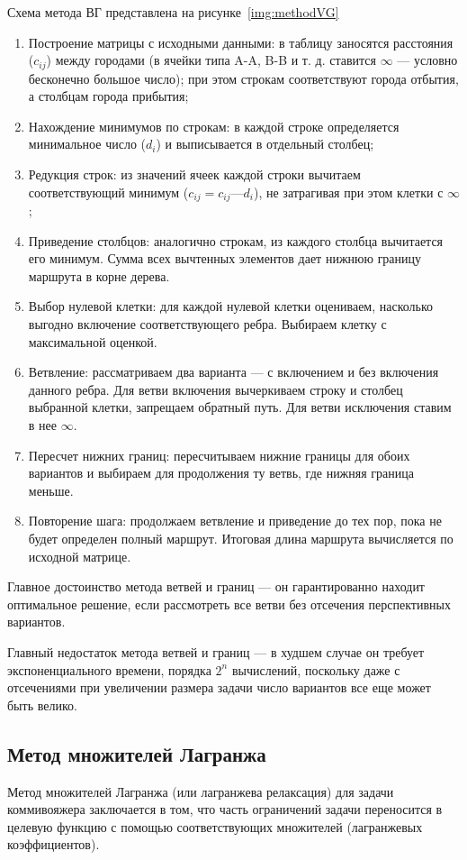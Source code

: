 Схема метода ВГ представлена на рисунке~\ref{img:methodVG}\clearpage
{}
\begin{enumerate}
    \item Построение матрицы с исходными данными: в таблицу заносятся расстояния ($c_{ij}$) между городами (в ячейки типа A-A, B-B и т. д. ставится $\infty$ --- условно бесконечно большое число); при этом строкам соответствуют города отбытия, а столбцам города прибытия;
    \item Нахождение минимумов по строкам: в каждой строке определяется минимальное число ($d_{i}$) и выписывается в отдельный столбец;
    \item Редукция строк: из значений ячеек каждой строки вычитаем соответствующий минимум ($c_{ij} = c_{ij} — d_{i}$), не затрагивая при этом клетки с $\infty$;
    \item Приведение столбцов: аналогично строкам, из каждого столбца вычитается его минимум. Сумма всех вычтенных элементов дает нижнюю границу маршрута в корне дерева.
    \item Выбор нулевой клетки: для каждой нулевой клетки оцениваем, насколько выгодно включение соответствующего ребра. Выбираем клетку с максимальной оценкой.
    \item Ветвление: рассматриваем два варианта — с включением и без включения данного ребра. Для ветви включения вычеркиваем строку и столбец выбранной клетки, запрещаем обратный путь. Для ветви исключения ставим в нее $\infty$.
    \item Пересчет нижних границ: пересчитываем нижние границы для обоих вариантов и выбираем для продолжения ту ветвь, где нижняя граница меньше.
    \item Повторение шага: продолжаем ветвление и приведение до тех пор, пока не будет определен полный маршрут. Итоговая длина маршрута вычисляется по исходной матрице.
\end{enumerate}

Главное достоинство метода ветвей и границ --- он гарантированно находит оптимальное решение, если рассмотреть все ветви без отсечения перспективных вариантов.

Главный недостаток метода ветвей и границ --- в худшем случае он требует экспоненциального времени, порядка $2^n$ вычислений, поскольку даже с отсечениями при увеличении размера задачи число вариантов все еще может быть велико.

\subsection{Метод множителей Лагранжа}
Метод множителей Лагранжа (или лагранжева релаксация) для задачи коммивояжера заключается в том, что часть ограничений задачи переносится в целевую функцию с помощью соответствующих множителей (лагранжевых коэффициентов).

